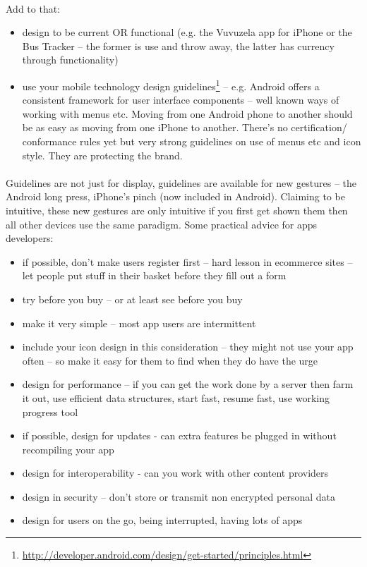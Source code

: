 \documentclass[12pt, a4paper, twoside]{book}
\begin{document}
\paragraph{} Add to that:

\begin{itemize}
\item design to be current OR functional (e.g. the Vuvuzela app for iPhone or the Bus Tracker – the former is use and throw away, the latter has currency through functionality)
\item use your mobile technology design guidelines\footnote{\url{http://developer.android.com/design/get-started/principles.html}} – e.g. Android offers a consistent framework for user interface components – well known ways of working with menus etc. Moving from one Android phone to another should be as easy as moving from one iPhone to another. There's no certification/ conformance rules yet but very strong guidelines on use of menus etc and icon style. They are protecting the brand.
\end{itemize}

\paragraph{} Guidelines are not just for display, guidelines are available for new gestures – the Android long press, iPhone’s pinch (now included in Android). Claiming to be intuitive, these new gestures are only intuitive if you first get shown them then all other devices use the same paradigm.
Some practical advice for apps developers:
\begin{itemize}
\item if possible, don't make users register first – hard lesson in ecommerce sites – let people put stuff in their basket before they fill out a form
\item try before you buy – or at least see before you buy
\item make it very simple – most app users are intermittent
\item include your icon design in this consideration – they might not use your app often – so make it easy for them to find when they do have the urge
\item design for performance – if you can get the work done by a server then farm it out, use efficient data structures, start fast, resume fast, use working progress tool
\item if possible, design for updates  - can extra features be plugged in without recompiling your app
\item design for interoperability  - can you work with other content providers
\item design in security – don't store or transmit non encrypted personal data
\item design for users on the go, being interrupted, having lots of apps
\end{itemize}
\end{document}
